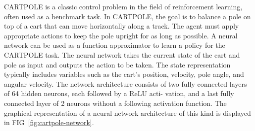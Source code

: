 \begin{itemize}
    CARTPOLE is a classic control problem in the field of reinforcement learning, often used as a benchmark task. In CARTPOLE, the goal is to balance a pole on top of a cart that can move horizontally along a track. 
    The agent must apply appropriate actions to keep the pole upright for as long as possible.
    A neural network can be used as a function approximator to learn a policy for the CARTPOLE task. The neural network takes the current state of the cart and pole as input and outputs the action to be taken. 
    The state representation typically includes variables such as the cart's position, velocity, pole angle, and angular velocity.
    The network architecture consists of two fully connected layers of 64 hidden neurons, each followed by a ReLU acti- vation, and a last fully connected layer of 2 neurons without a following activation function. 
    The graphical representation of a neural network architecture of this kind is displayed in FIG~\ref{fig:cartpole-network}.


\end{itemize}

